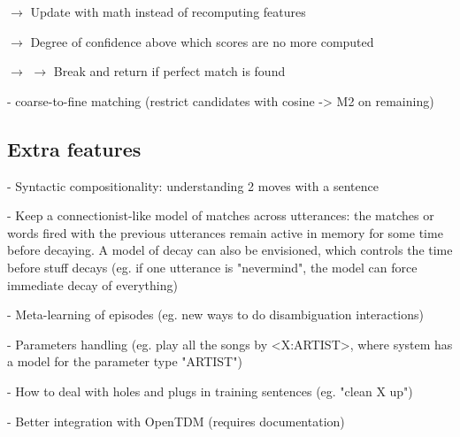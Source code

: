    $\rightarrow$ Update with math instead of recomputing features
   
   $\rightarrow$ Degree of confidence above which scores are no more computed
   
   $\rightarrow$ $\rightarrow$ Break and return if perfect match is found
   
- coarse-to-fine matching (restrict candidates with cosine -> M2 on remaining)
 
\subsection{Extra features}

- Syntactic compositionality: understanding 2 moves with a sentence

- Keep a connectionist-like model of matches across utterances: the matches or 
  words fired with the previous utterances remain active in memory for some 
  time before decaying. A model of decay can also be envisioned, which controls
  the time before stuff decays (eg. if one utterance is "nevermind", the model
  can force immediate decay of everything)

- Meta-learning of episodes (eg. new ways to do disambiguation interactions)

- Parameters handling (eg. play all the songs by <X:ARTIST>, where system has a
  model for the parameter type "ARTIST")
  
- How to deal with holes and plugs in training sentences (eg. "clean X up")

- Better integration with OpenTDM (requires documentation)


